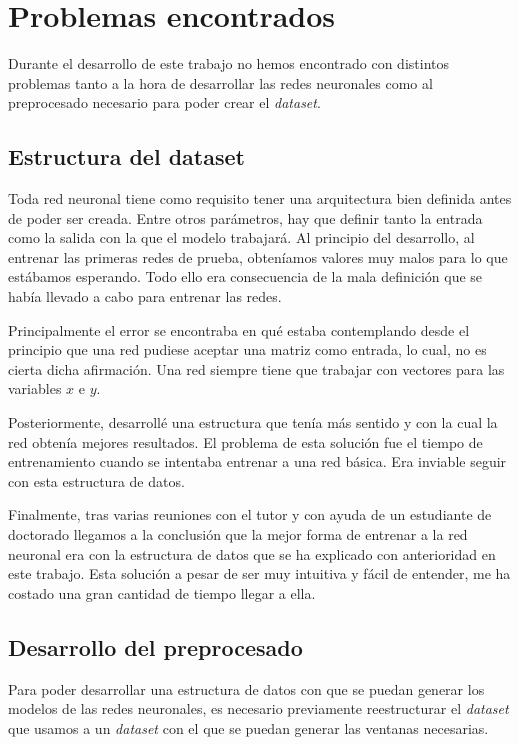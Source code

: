 \section{Problemas encontrados}

Durante el desarrollo de este trabajo no hemos encontrado con distintos problemas tanto a la hora de desarrollar las redes neuronales como al preprocesado necesario para poder crear el \textit{dataset}.

\subsection{Estructura del dataset}
Toda red neuronal tiene como requisito tener una arquitectura bien definida antes de poder ser creada. Entre otros parámetros, hay que definir tanto la entrada como la salida con la que el modelo trabajará. Al principio del desarrollo, al entrenar las primeras redes de prueba, obteníamos valores muy malos para lo que estábamos esperando. Todo ello era consecuencia de la mala definición que se había llevado a cabo para entrenar las redes.
\newline

Principalmente el error se encontraba en qué estaba contemplando desde el principio que una red pudiese aceptar una matriz como entrada, lo cual, no es cierta dicha afirmación. Una red siempre tiene que trabajar con vectores para las variables $x$ e $y$.
\newline

Posteriormente, desarrollé una estructura que tenía más sentido y con la cual la red obtenía mejores resultados. El problema de esta solución fue el tiempo de entrenamiento cuando se intentaba entrenar a una red básica. Era inviable seguir con esta estructura de datos.
\newline

Finalmente, tras varias reuniones con el tutor y con ayuda de un estudiante de doctorado llegamos a la conclusión que la mejor forma de entrenar a la red neuronal era con la estructura de datos que se ha explicado con anterioridad en este trabajo. Esta solución a pesar de ser muy intuitiva y fácil de entender, me ha costado una gran cantidad de tiempo llegar a ella.


\subsection{Desarrollo del preprocesado}
Para poder desarrollar una estructura de datos con que se puedan generar los modelos de las redes neuronales, es necesario previamente reestructurar el \textit{dataset} que usamos a un \textit{dataset} con el que se puedan generar las ventanas necesarias.
\newline

